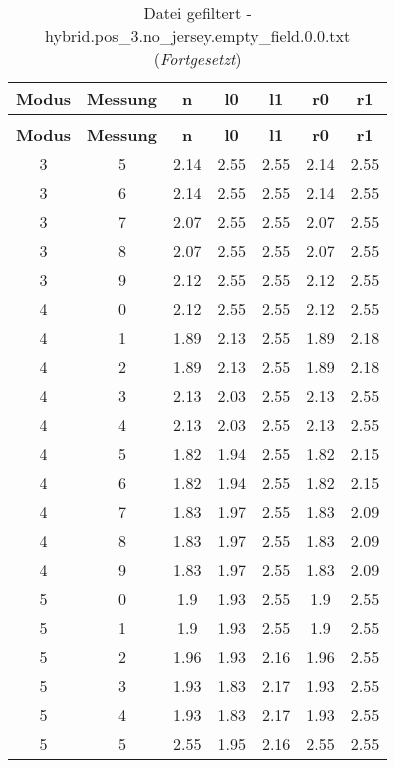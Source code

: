 \begin{longtable}{|c|c||c||c|c||c|c|}
	\caption{Datei gefiltert - hybrid.pos\_3.no\_jersey.empty\_field.0.0.txt} \label{tab:hybrid.pos-3.no-jersey.empty-field.0.0.txt} \\ \hline
	\textbf{Modus} & \textbf{Messung} & \textbf{n} & \textbf{l0} & \textbf{l1} & \textbf{r0} & \textbf{r1}\\ \hline
	\endfirsthead
	\caption[]{Datei gefiltert - hybrid.pos\_3.no\_jersey.empty\_field.0.0.txt (\emph{Fortgesetzt})} \\ \hline
	\textbf{Modus} & \textbf{Messung} & \textbf{n} & \textbf{l0} & \textbf{l1} & \textbf{r0} & \textbf{r1}\\ \hline
	\endhead
	3 & 5 & 2.14 & 2.55 & 2.55 & 2.14 & 2.55 \\ \hline
	3 & 6 & 2.14 & 2.55 & 2.55 & 2.14 & 2.55 \\ \hline
	3 & 7 & 2.07 & 2.55 & 2.55 & 2.07 & 2.55 \\ \hline
	3 & 8 & 2.07 & 2.55 & 2.55 & 2.07 & 2.55 \\ \hline
	3 & 9 & 2.12 & 2.55 & 2.55 & 2.12 & 2.55 \\ \hline
	4 & 0 & 2.12 & 2.55 & 2.55 & 2.12 & 2.55 \\ \hline
	4 & 1 & 1.89 & 2.13 & 2.55 & 1.89 & 2.18 \\ \hline
	4 & 2 & 1.89 & 2.13 & 2.55 & 1.89 & 2.18 \\ \hline
	4 & 3 & 2.13 & 2.03 & 2.55 & 2.13 & 2.55 \\ \hline
	4 & 4 & 2.13 & 2.03 & 2.55 & 2.13 & 2.55 \\ \hline
	4 & 5 & 1.82 & 1.94 & 2.55 & 1.82 & 2.15 \\ \hline
	4 & 6 & 1.82 & 1.94 & 2.55 & 1.82 & 2.15 \\ \hline
	4 & 7 & 1.83 & 1.97 & 2.55 & 1.83 & 2.09 \\ \hline
	4 & 8 & 1.83 & 1.97 & 2.55 & 1.83 & 2.09 \\ \hline
	4 & 9 & 1.83 & 1.97 & 2.55 & 1.83 & 2.09 \\ \hline
	5 & 0 & 1.9 & 1.93 & 2.55 & 1.9 & 2.55 \\ \hline
	5 & 1 & 1.9 & 1.93 & 2.55 & 1.9 & 2.55 \\ \hline
	5 & 2 & 1.96 & 1.93 & 2.16 & 1.96 & 2.55 \\ \hline
	5 & 3 & 1.93 & 1.83 & 2.17 & 1.93 & 2.55 \\ \hline
	5 & 4 & 1.93 & 1.83 & 2.17 & 1.93 & 2.55 \\ \hline
	5 & 5 & 2.55 & 1.95 & 2.16 & 2.55 & 2.55 \\ \hline

\end{longtable}
